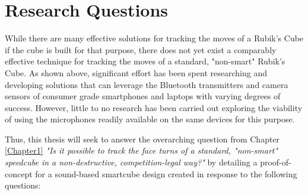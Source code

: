 \section{Research Questions}
\label{sec:research-questions}

While there are many effective solutions for tracking the moves of a
Rubik's Cube if the cube is built for that purpose, there does not yet
exist a comparably effective technique for tracking the moves of a
standard, "non-smart" Rubik's Cube. As shown above, significant effort
has been spent researching and developing solutions that can leverage
the Bluetooth transmitters and camera sensors of consumer grade
smartphones and laptops with varying degrees of success. However,
little to no research has been carried out exploring the viability of
using the microphones readily available on the same devices for this
purpose.

Thus, this thesis will seek to answer the overarching question from
Chapter \ref{Chapter1} \emph{"Is it possible to track the face turns of
a standard, "non-smart" speedcube in a non-destructive,
competition-legal way?"} by detailing a proof-of-concept for a
sound-based smartcube design created in response to the following
questions:

